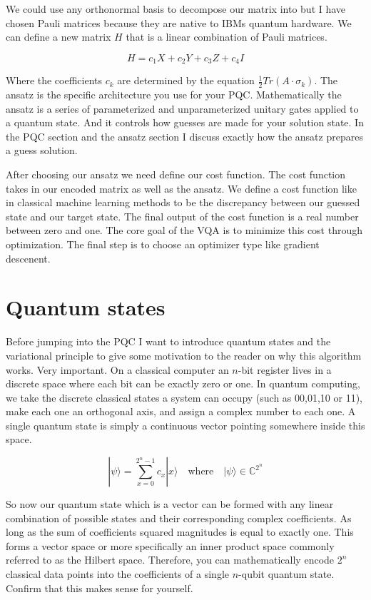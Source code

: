 \documentclass[12pt, oneside]{book}
\begin{document}
We could use any orthonormal basis to decompose our matrix into but I have chosen Pauli matrices because they are native to 
IBMs quantum hardware. We can define a new matrix $H$ that is a linear combination of Pauli matrices.

$$
H = c_1X + c_2Y + c_3Z + c_4I 
$$


Where the coefficients $c_k$ are determined by the equation $\frac{1}{2} Tr (A \cdot \sigma_k)$. The ansatz is the specific
architecture you use for your PQC. Mathematically the ansatz is a series of parameterized and unparameterized
unitary gates applied to a quantum state. And it controls how guesses are made for your solution state. In the PQC section
and the ansatz section I discuss exactly how the ansatz prepares a guess solution. 

After choosing our ansatz we need define our cost function. The cost function takes in our encoded matrix as well as the ansatz. 
We define a cost function like in classical machine learning methods to be the discrepancy between our guessed state and our
target state. The final output of the cost function is a real number between zero and one. The core goal of the VQA is to minimize this cost 
through optimization. The final step is to choose an optimizer type like gradient descenent. 


\section{Quantum states}
Before jumping into the PQC I want to introduce quantum states and the variational principle to give some motivation to 
the reader on why this algorithm works. Very important. On a classical computer an $n$-bit register lives in a discrete space where each bit can be exactly 
zero or one. In quantum computing, we take the discrete classical states a system can occupy (such as 00,01,10 or 11), make each one an orthogonal axis, 
and assign a complex number to each one. A single quantum state is simply a continuous vector pointing somewhere inside this space.

$$
|\psi\rangle=\sum_{x=0}^{2^n-1} c_x|x\rangle \quad \text{where} \quad|\psi\rangle \in \mathbb{C}^{2^n}
$$

So now our quantum state which is a vector can be formed with any linear combination of possible states and their corresponding 
complex coefficients. As long as the sum of coefficients squared magnitudes is equal to exactly one. This forms a vector space or more specifically 
an inner product space commonly referred to as the Hilbert space. Therefore, you can mathematically encode $2^n$ classical data points 
into the coefficients of a single $n$-qubit quantum state. Confirm that this makes sense for yourself. 
\end{document}
